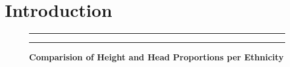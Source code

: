 \documentclass[]{article}
\begin{document}
\vskip -8.5pt




\noindent  

\section{Introduction}
\label{sec:intro}

\begin{figure}[!ht]
    \hrule
    \caption{ \textbf{Comparision of Height and Head Proportions per Ethnicity} }
    \begin{center}
    \end{center}
    \label{fig:OnePlot}
    \hrule
\end{figure}

\newpage
\end{document}
